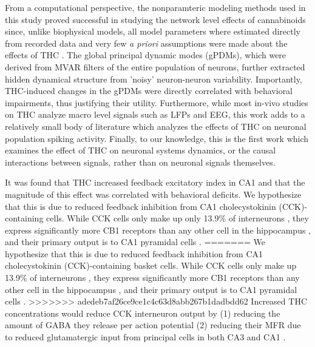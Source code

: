 \documentclass[11pt,a4paper,final]{article}
\begin{document}
From a computational perspective, the nonparamteric modeling methods used in this study proved successful in studying the network level effects of cannabinoids since, unlike biophysical models, all model parameters where estimated directly from recorded data and very few \textit{a priori} assumptions were made about the effects of THC \citep{marm04,song09par1,sandler15}.
The global principal dynamic modes (gPDMs), which were derived from MVAR filters of the entire population of neurons, further extracted hidden dynamical structure from 'noisy' neuron-neuron variability.
Importantly, THC-induced changes in the gPDMs were directly correlated with behavioral impairments, thus justifying their utility.
Furthermore, while most in-vivo studies on THC analyze macro level signals such as LFPs and EEG, this work adds to a relatively small body of literature which analyzes the effects of THC on neuronal population spiking activity.
Finally, to our knowledge, this is the first work which examines the effect of THC on neuronal systems dynamics, or the causal interactions between signals, rather than on neuronal signals themselves.

It was found that THC increased feedback excitatory index in CA1 and that the magnitude of this effect was correlated with behavioral deficits. 
We hypothesize that this is due to reduced feedback inhibition from CA1 cholecystokinin (CCK)-containing cells.
While CCK cells only make up only 13.9\% of interneurons \citep{bezaire13}, they express significantly more CB1 receptors than any other cell in the hippocampus \citep{katona00}, and their primary output is to CA1 pyramidal cells \citep{bezaire13}.
=======
We hypothesize that this is due to reduced feedback inhibition from CA1 cholecystokinin (CCK)-containing basket cells.
While CCK cells only make up 13.9\% of interneurons \citep{bezaire13}, they express significantly more CB1 receptors than any other cell in the hippocampus \citep{katona00}, and their primary output is to CA1 pyramidal cells \citep{bezaire13}.
>>>>>>> adedeb7af26ce9ce1c4c63d8abb267b1dadbdd62
Increased THC concentrations would reduce CCK interneuron output by (1) reducing the amount of GABA they release per action potential (2) reducing their MFR due to reduced glutamatergic input from principal cells in both CA3 and CA1 \citep{gulyas04,lee10}.
\end{document}
